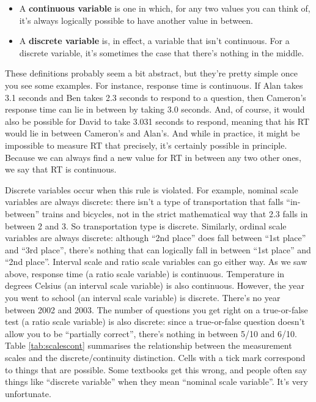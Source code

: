 \documentclass[
]{book}
\providecommand{\tightlist}{%
  \setlength{\itemsep}{0pt}\setlength{\parskip}{0pt}}
\theoremstyle{definition}
\theoremstyle{definition}
\theoremstyle{definition}
\theoremstyle{definition}
\theoremstyle{remark}
\begin{document}
\begin{itemize}
\tightlist
\item
  A \textbf{continuous variable} is one in which, for any two values you can think of, it's always logically possible to have another value in between.
\item
  A \textbf{discrete variable} is, in effect, a variable that isn't continuous. For a discrete variable, it's sometimes the case that there's nothing in the middle.
\end{itemize}

These definitions probably seem a bit abstract, but they're pretty simple once you see some examples. For instance, response time is continuous. If Alan takes 3.1 seconds and Ben takes 2.3 seconds to respond to a question, then Cameron's response time can lie in between by taking 3.0 seconds. And, of course, it would also be possible for David to take 3.031 seconds to respond, meaning that his RT would lie in between Cameron's and Alan's. And while in practice, it might be impossible to measure RT that precisely, it's certainly possible in principle. Because we can always find a new value for RT in between any two other ones, we say that RT is continuous.

Discrete variables occur when this rule is violated. For example, nominal scale variables are always discrete: there isn't a type of transportation that falls ``in-between'' trains and bicycles, not in the strict mathematical way that 2.3 falls in between 2 and 3. So transportation type is discrete. Similarly, ordinal scale variables are always discrete: although ``2nd place'' does fall between ``1st place'' and ``3rd place'', there's nothing that can logically fall in between ``1st place'' and ``2nd place''. Interval scale and ratio scale variables can go either way. As we saw above, response time (a ratio scale variable) is continuous. Temperature in degrees Celsius (an interval scale variable) is also continuous. However, the year you went to school (an interval scale variable) is discrete. There's no year between 2002 and 2003. The number of questions you get right on a true-or-false test (a ratio scale variable) is also discrete: since a true-or-false question doesn't allow you to be ``partially correct'', there's nothing in between 5/10 and 6/10. Table \ref{tab:scalescont} summarises the relationship between the measurement scales and the discrete/continuity distinction. Cells with a tick mark correspond to things that are possible. Some textbooks get this wrong, and people often say things like ``discrete variable'' when they mean ``nominal scale variable''. It's very unfortunate.
\end{document}
